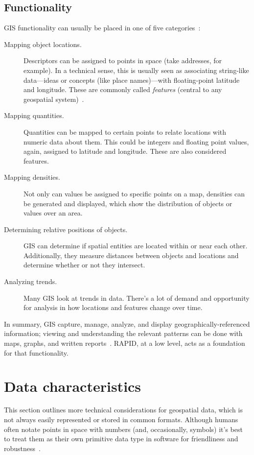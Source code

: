 \subsection{Functionality}
GIS functionality can usually be placed in one of five categories~\cite{Esriintro}:

\begin{description}
  \item[Mapping object locations.] Descriptors can be assigned to points in space (take addresses, for example). In a technical sense, this is usually seen as associating string-like data---ideas or concepts (like place names)---with floating-point latitude and longitude. These are commonly called \textit{features} (central to any geospatial system)~\cite{Kottman2009}.
  \item[Mapping quantities.] Quantities can be mapped to certain points to relate locations with numeric data about them. This could be integers and floating point values, again, assigned to latitude and longitude. These are also considered features.
  \item[Mapping densities.] Not only can values be assigned to specific points on a map, densities can be generated and displayed, which show the distribution of objects or values over an area.
  \item[Determining relative positions of objects.] GIS can determine if spatial entities are located within or near each other. Additionally, they measure distances between objects and locations and determine whether or not they intersect.
  \item[Analyzing trends.] Many GIS look at trends in data. There's a lot of demand and opportunity for analysis in how locations and features change over time.
\end{description}

In summary, GIS capture, manage, analyze, and display geographically-referenced information; viewing and understanding the relevant patterns can be done with maps, graphs, and written reports~\cite{Esriintro}. RAPID, at a low level, acts as a foundation for that functionality.

\section{Data characteristics}
This section outlines more technical considerations for geospatial data, which is not always easily represented or stored in common formats. Although humans often notate points in space with numbers (and, occasionally, symbols) it's best to treat them as their own primitive data type in software for friendliness and robustness~\cite{gentle_intro}.

